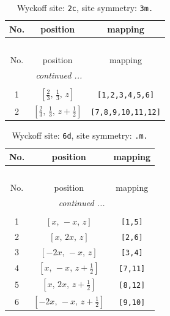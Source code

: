 \documentclass[fleqn,8pt]{jsarticle}
\begin{document}
\renewcommand{\arraystretch}{1.2}
\begin{longtable}{ccc}
\caption{Wyckoff site: {\tt 2c}, site symmetry: {\tt 3m.}}
 \\
 \hline \hline
No. & position & mapping \\ \hline \endfirsthead

\multicolumn{2}{l}{\tablename\ \thetable{}} \\
 \hline \hline
No. & position & mapping \\ \hline \endhead

 \hline \hline
\multicolumn{2}{r}{\footnotesize\it continued ...} \\ \endfoot

 \hline \hline
\multicolumn{2}{r}{} \\ \endlastfoot

1 & $\left[ \frac{2}{3},\, \frac{1}{3},\, z \right]$ & {\tt [1,2,3,4,5,6]} \\ \hline
2 & $\left[ \frac{2}{3},\, \frac{1}{3},\, z + \frac{1}{2} \right]$ & {\tt [7,8,9,10,11,12]} \\
\end{longtable}
\renewcommand{\arraystretch}{1.2}
\begin{longtable}{ccc}
\caption{Wyckoff site: {\tt 6d}, site symmetry: {\tt .m.}}
 \\
 \hline \hline
No. & position & mapping \\ \hline \endfirsthead

\multicolumn{2}{l}{\tablename\ \thetable{}} \\
 \hline \hline
No. & position & mapping \\ \hline \endhead

 \hline \hline
\multicolumn{2}{r}{\footnotesize\it continued ...} \\ \endfoot

 \hline \hline
\multicolumn{2}{r}{} \\ \endlastfoot

1 & $\left[ x,\, - x,\, z \right]$ & {\tt [1,5]} \\ \hline
2 & $\left[ x,\, 2 x,\, z \right]$ & {\tt [2,6]} \\ \hline
3 & $\left[ - 2 x,\, - x,\, z \right]$ & {\tt [3,4]} \\ \hline
4 & $\left[ x,\, - x,\, z + \frac{1}{2} \right]$ & {\tt [7,11]} \\ \hline
5 & $\left[ x,\, 2 x,\, z + \frac{1}{2} \right]$ & {\tt [8,12]} \\ \hline
6 & $\left[ - 2 x,\, - x,\, z + \frac{1}{2} \right]$ & {\tt [9,10]} \\
\end{longtable}
\end{document}
